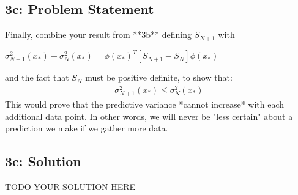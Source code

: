 \documentclass[10pt]{article}
\newcommand{\officialdirections}[1]{{\color{purple} #1}}
\begin{document}
\officialdirections{
\subsection*{3c: Problem Statement}
Finally, combine your result from **3b** defining $S_{N+1}$ with

$\sigma^2_{N+1}(x_*) - \sigma^2_{N}(x_*) = \phi(x_*)^T \left[ S_{N+1} - S_{N} \right] \phi(x_*)$ 

and the fact that $S_N$ must be positive definite, to show that:
\begin{align}
\sigma_{N+1}^2(x_*) \leq \sigma_N^2(x_*)
\end{align}
This would prove that the predictive variance *cannot increase* with each additional data point. In other words, we will never be "less certain" about a prediction we make if we gather more data.
}


\subsection{3c: Solution}
TODO YOUR SOLUTION HERE
\end{document}
